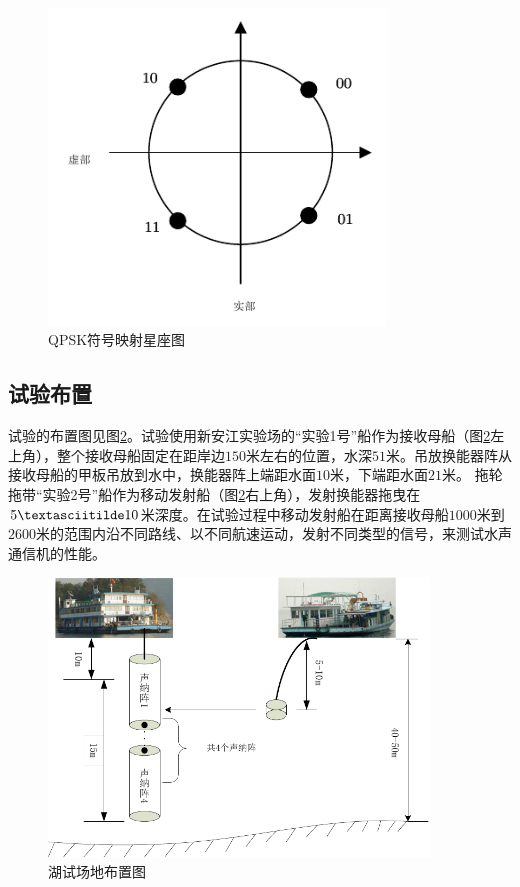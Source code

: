 \begin{figure}[htb]
  \begin{center}
    \includegraphics[width=0.8\textwidth]{images/qpsk.pdf}
  \end{center}
  \caption{QPSK符号映射星座图}
  \label{fig:6.1}
\end{figure}
\subsection{试验布置}
试验的布置图见图\ref{fig:6.3}。试验使用新安江实验场的“实验1号”船作为接收母船（图\ref{fig:6.3}左上角），整个接收母船固定在距岸边$150$米左右的位置，水深$51$米。吊放换能器阵从接收母船的甲板吊放到水中，换能器阵上端距水面$10$米，下端距水面$21$米。
拖轮拖带“实验2号”船作为移动发射船（图\ref{fig:6.3}右上角），发射换能器拖曳在$5\textasciitilde10$米深度。在试验过程中移动发射船在距离接收母船$1000$米到$2600$米的范围内沿不同路线、以不同航速运动，发射不同类型的信号，来测试水声通信机的性能。
\begin{figure}[htb]
  \begin{center}
    \includegraphics[width=0.9\textwidth]{images/trans.pdf}
  \end{center}
  \caption{湖试场地布置图}
  \label{fig:6.3}
\end{figure}
